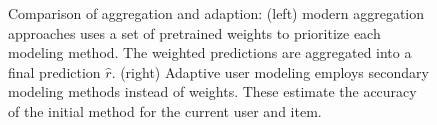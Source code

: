 \begin{figure}[t]
\begin{minipage}{0.49\textwidth}
  \end{minipage} 
  \vspace{2em}
  \caption[Comparison of Aggregation and Adaption]{
    Comparison of aggregation and adaption:
    (left) modern aggregation approaches uses a set of pretrained weights
    to prioritize each modeling method.
    The weighted predictions are aggregated into a final prediction $\hat{r}$.
    (right) Adaptive user modeling employs secondary modeling methods instead
    of weights. These estimate the accuracy of the initial method
    for the current user and item.
  }
  \label{fig:layer:comparison}
\end{figure}


